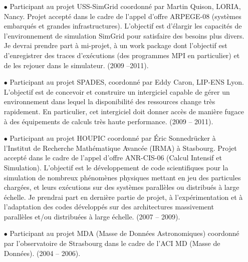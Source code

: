 \begin{itemize}
\item[$\bullet$]
Participant au projet USS-SimGrid coordonné par Martin Quison, LORIA, Nancy. 
Projet accepté dans le cadre de l'appel d'offre ARPEGE-08 (systèmes embarqués et grandes infrastructures).
L'objectif est d'élargir les capacités de l'environnement de simulation SimGrid pour satisfaire des besoins plus divers.
Je devrai prendre part à mi-projet, à un work package dont l'objectif est d'enregistrer des traces d'exécutions (des programmes
MPI en particulier) et de les rejouer dans le simulateur. (2009 --2011).\\


\item[$\bullet$]
Participant au projet SPADES, coordonné par Eddy Caron, LIP-ENS Lyon.
L'objectif est de concevoir et construire un intergiciel capable de gérer un environnement 
dans lequel la disponibilité des
ressources change très rapidement. En particulier, cet intergiciel doit donner accès de manière fugace à 
des équipements de calculs très haute performance. (2009 -- 2011).\\


\item[$\bullet$]
Participant au projet HOUPIC coordonné par \'{E}ric Sonnedrücker à l'Institut de Recherche 
Mathématique Avancée (IRMA) à Stasbourg. 
Projet accepté dans le cadre de l'appel d'offre ANR-CIS-06 (Calcul Intensif et Simulation). 
L'objectif est le développement de code scientifiques pour la simulation de nombreux phénomènes physiques mettant en jeu des particules chargées, et leurs exécutions sur des systèmes parallèles ou distribués à large échelle.
Je prendrai part en dernière partie de projet, à l'expérimentation et à l'adaptation des codes développés 
sur des architectures massivement parallèles et/ou distribuées à large échelle.
(2007 -- 2009).\\


\item[$\bullet$] Participant au projet MDA (Masse de Données Astronomiques) coordonné par l'observatoire de Strasbourg dans le cadre de l'ACI MD (Masse de Données). (2004 -- 2006).\\



\end{itemize}
